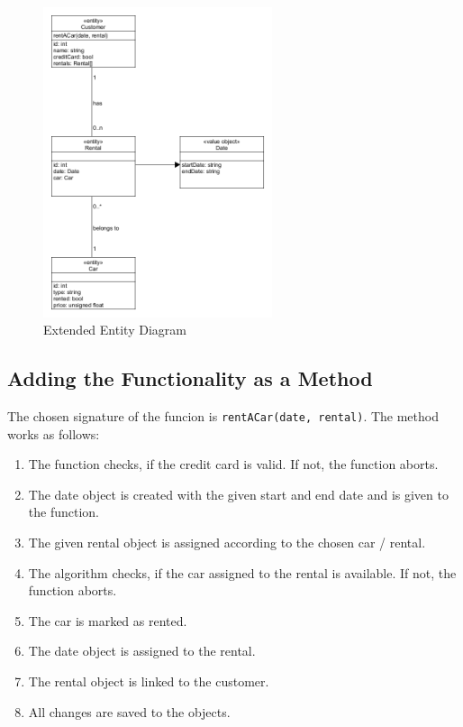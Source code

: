 \begin{figure}[h]
    \centering
    \includegraphics[width=0.6\textwidth]{figures/goLang/carRental/carRental_extendedEntity.png}
    \caption{Extended Entity Diagram}
    \label{fig:extendedEntityDiagram}
\end{figure}

\subsection*{Adding the Functionality as a Method}
The chosen signature of the funcion is \texttt{rentACar(date, rental)}.
The method works as follows:
\begin{enumerate}
    \item The function checks, if the credit card is valid. If not, the function aborts.
    \item The date object is created with the given start and end date and is given to the function.
    \item The given rental object is assigned according to the chosen car / rental.
    \item The algorithm checks, if the car assigned to the rental is available. If not, the function aborts.
    \item The car is marked as rented.
    \item The date object is assigned to the rental.
    \item The rental object is linked to the customer.
    \item All changes are saved to the objects.
\end{enumerate}

